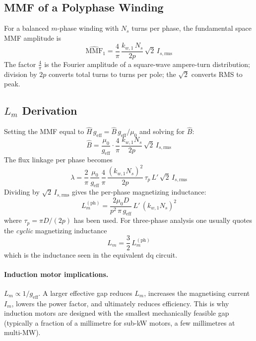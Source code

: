 \documentclass[12pt,a4paper]{article}
\begin{document}
\subsection{MMF of a Polyphase Winding}

For a balanced $m$-phase winding with $N_s$ turns per phase, the
fundamental space MMF amplitude is
\begin{equation}
  \widehat{\mathrm{MMF}}_1
    = \frac{4}{\pi}\,\frac{k_{w,1}\,N_s}{2p}\,\sqrt{2}\,I_{s,\text{rms}}
  \label{eq:mmf1}
\end{equation}
The factor $\tfrac{4}{\pi}$ is the Fourier amplitude of a square-wave
ampere-turn distribution; division by $2p$ converts total turns to
turns per pole; the $\sqrt{2}$ converts RMS to peak.

\subsection{$L_m$ Derivation}

Setting the MMF equal to $\hat H\,g_\text{eff} =
\hat B\,g_\text{eff}/\mu_0$ and solving for $\hat B$:
\begin{equation}
  \hat B
    = \frac{\mu_0}{g_\text{eff}}\cdot
      \frac{4}{\pi}\,\frac{k_{w,1}N_s}{2p}\,\sqrt{2}\,I_{s,\text{rms}}
\end{equation}
The flux linkage per phase becomes
\begin{equation}
  \lambda = \frac{2}{\pi}\,\frac{\mu_0}{g_\text{eff}}\,
            \frac{4}{\pi}\,\frac{(k_{w,1}N_s)^2}{2p}\,
            \tau_p\,L'\,\sqrt{2}\,I_{s,\text{rms}}
\end{equation}
Dividing by $\sqrt{2}\,I_{s,\text{rms}}$ gives the per-phase
magnetizing inductance:
\begin{equation}
  L_m^{(\text{ph})}
    = \frac{2\mu_0 D}{p^2\,\pi\,g_\text{eff}}\,L'\,(k_{w,1}N_s)^2
  \label{eq:Lm_phase}
\end{equation}
where $\tau_p = \pi D/(2p)$ has been used. For three-phase analysis
one usually quotes the \emph{cyclic} magnetizing inductance
\begin{equation}
  L_m = \frac{3}{2}\,L_m^{(\text{ph})}
  \label{eq:Lm_cyclic}
\end{equation}
which is the inductance seen in the equivalent dq circuit.

\paragraph{Induction motor implications.}
$L_m \propto 1/g_\text{eff}$. A larger effective gap reduces $L_m$,
increases the magnetising current $I_m$, lowers the power factor, and
ultimately reduces efficiency. This is why induction motors are
designed with the smallest mechanically feasible gap (typically a
fraction of a millimetre for sub-kW motors, a few millimetres at
multi-MW).
\end{document}

